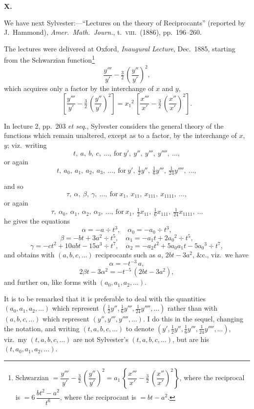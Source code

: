 \documentclass[11pt]{article}
\begin{document}
\medskip
\begin{center}\textbf{X.}\end{center}

We have next Sylvester:---``Lectures on the theory of Reciprocants'' (reported by J.\ Hammond), \textit{Amer.\ Math.\ Journ.}, t.\ \textsc{viii}.\ (1886), pp.\ 196--260.

The lectures were delivered at Oxford, \emph{Inaugural Lecture}, Dec.\ 1885, starting from the Schwarzian function\footnote{Schwarzian $= \dfrac{y'''}{y'} - \tfrac{3}{2}\,\left(\dfrac{y''}{y'}\right)^2 = a_1\,\left\{\dfrac{x'''}{x'} - \tfrac{3}{2}\,\left(\dfrac{x''}{x'}\right)^2\right\}$, where the reciprocal is $= 6\,\dfrac{b t^2 - a^2}{t^6}$, where the reciprocant is $= b t - a^2$.}
\[
\frac{y'''}{y'} - \tfrac{3}{2}\,\left(\frac{y''}{y'}\right)^2,
\]
which acquires only a factor by the interchange of $x$ and $y$,
\[
\left[\frac{y'''}{y'} - \tfrac{3}{2}\,\left(\frac{y''}{y'}\right)^2\right] = x_1{}^2\,\left[\frac{x'''}{x'} - \tfrac{3}{2}\,\left(\frac{x''}{x'}\right)^2\right].
\]

In lecture 2, pp.\ 203 \emph{et seq.}, Sylvester considers the general theory of the functions which remain unaltered, except as to a factor, by the interchange of $x$, $y$; viz.\ writing
\[
t,\ a,\ b,\ c,\ \ldots,\ \text{for}\ y',\ y'',\ y''',\ y'''',\ \ldots,
\]
or again
\[
t,\ a_0,\ a_1,\ a_2,\ a_3,\ \ldots,\ \text{for}\ y',\ \tfrac{1}{2} y'',\ \tfrac{1}{6} y''',\ \tfrac{1}{24} y'''',\ \ldots,
\]

and so
\[
\tau,\ \alpha,\ \beta,\ \gamma,\ \ldots,\ \text{for}\ x_1,\ x_{11},\ x_{111},\ x_{1111},\ \ldots,
\]
or again
\[
\tau,\ \alpha_0,\ \alpha_1,\ \alpha_2,\ \alpha_3,\ \ldots,\ \text{for}\ x_1,\ \tfrac{1}{2} x_{11},\ \tfrac{1}{6} x_{111},\ \tfrac{1}{24} x_{1111},\ \ldots
\]
he gives the equations
\[
\alpha = -a \div t^3,\quad \alpha_0 = -a_0 \div t^3,
\]
\[
\beta = -b t + 3 a^2 \div t^5,\quad \alpha_1 = -a_1 t + 2 a_0{}^2 \div t^5,
\]
\[
\gamma = -c t^2 + 10 a b t - 15 a^3 \div t^7,\quad \alpha_2 = -a_2 t^2 + 5 a_0 a_1 t - 5 a_0{}^3 \div t^7,
\]
and obtains with $(a, b, c, \ldots)$ reciprocants such as $a$, $2 b t - 3 a^2$, \&c., viz.\ we have
\[
\alpha = -t^{-3}\,a,
\]
\[
2\beta t - 3\alpha^2 = -t^{-5}\,(2 b t - 3 a^2),
\]
and further on, like forms with $(a_0, a_1, a_2, \ldots)$.

It is to be remarked that it is preferable to deal with the quantities $(a_0, a_1, a_2, \ldots)$ which represent $(\tfrac{1}{2} y'', \tfrac{1}{6} y''', \tfrac{1}{24} y'''', \ldots)$ rather than with $(a, b, c, \ldots)$ which represent $(y'', y''', y'''', \ldots)$. I do this in the sequel, changing the notation, and writing $(t, a, b, c, \ldots)$ to denote $(y', \tfrac{1}{2} y'', \tfrac{1}{6} y''', \tfrac{1}{24} y'''', \ldots)$, viz.\ my $(t, a, b, c, \ldots)$ are not Sylvester's $(t, a, b, c, \ldots)$, but are his $(t, a_0, a_1, a_2, \ldots)$.
\end{document}

